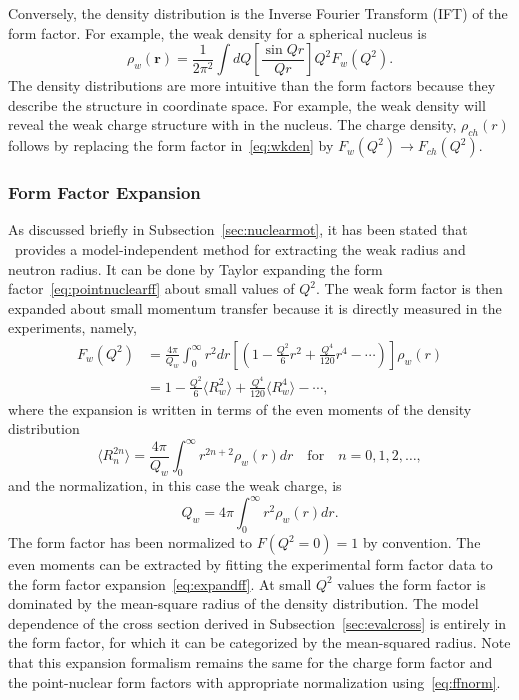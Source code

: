Conversely, the density distribution is the Inverse Fourier Transform (IFT) of the form factor. For example, the weak density for a spherical nucleus is
\begin{equation}\label{eq:wkden}
\rho _w(\mathbf{r})= \frac{1}{2\pi ^2}\int dQ \left[ \frac{\sin Qr}{Qr}\right]Q^2 F_w(Q^2).
\end{equation}
The density distributions are more intuitive than the form factors because they describe the structure in coordinate space. For example, the weak density will reveal the weak charge structure with in the nucleus. The charge density, $\rho _{ch}(r)$ follows by replacing the form factor in~\eqref{eq:wkden} by $F_w(Q^2)\rightarrow F_{ch}(Q^2)$. 

\subsubsection{Form Factor Expansion}

As discussed briefly in Subsection~\ref{sec:nuclearmot}, it has been stated that \cevns\ provides a model-independent method for extracting the weak radius and neutron radius. It can be done by Taylor expanding the form factor~\eqref{eq:pointnuclearff} about small values of $Q^2$. The weak form factor is then expanded about small momentum transfer because it is directly measured in the experiments, namely,
\begin{align}
F_w(Q^2) &= \frac{4\pi}{Q_w} \int_0^{\infty} r^2dr\left[ \left( 1-\frac{Q^2}{6}r^2+\frac{Q^4}{120}r^4 -\cdots \right) \right] \rho_w(r) \nonumber
\\
&= 1-\frac{Q^2}{6}\langle R_w^2 \rangle + \frac{Q^4}{120}\langle R_w^4 \rangle -\cdots ,\label{eq:expandff}
\end{align}
where the expansion is written in terms of the even moments of the density distribution 
\begin{equation}\label{eq:rootmean}
\langle R_n^{2n} \rangle = \frac{4\pi}{Q_w} \int_0^{\infty} r^{2n+2}\rho _w(r)dr \quad \text{for} \quad n=0,1,2,\dots ,
\end{equation} 
and the normalization, in this case the weak charge, is
\begin{equation}\label{eq:ffnorm}
Q_w=4\pi \int _0^{\infty} r^2 \rho _w(r)dr.
\end{equation}
The form factor has been normalized to $F(Q^2=0)=1$ by convention. The even moments can be extracted by fitting the experimental form factor data to the form factor expansion~\eqref{eq:expandff}. At small $Q^2$ values the form factor is dominated by the mean-square radius of the density distribution. The model dependence of the cross section derived in Subsection~\ref{sec:evalcross} is entirely in the form factor, for which it can be categorized by the mean-squared radius. Note that this expansion formalism remains the same for the charge form factor and the point-nuclear form factors with appropriate normalization using~\eqref{eq:ffnorm}. 


